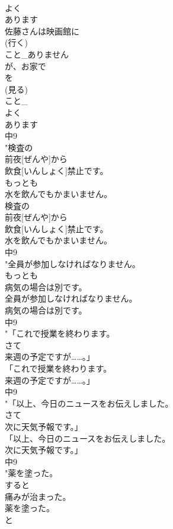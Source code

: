 \documentclass[8pt]{extreport}
\begin{document}
\begin{CJK}{UTF8}{min}
\\	よく
\\	あります
\\	佐藤さんは映画館に
\\	(行く)
\\	こと_ありません
\\	が、お家で
\\	を
\\	(見る)
\\	こと_
\\	よく
\\	あります
\\	中9
\\	"検査の
\\	前夜[ぜんや]から
\\	飲食[いんしょく]禁止です。
\\	もっとも
\\	水を飲んでもかまいません。
\\	検査の
\\	前夜[ぜんや]から
\\	飲食[いんしょく]禁止です。
\\	水を飲んでもかまいません。
\\	中9
\\	"全員が参加しなければなりません。
\\	もっとも
\\	病気の場合は別です。
\\	全員が参加しなければなりません。
\\	病気の場合は別です。
\\	中9
\\	"「これで授業を終わります。
\\	さて
\\	来週の予定ですが……。」
\\	「これで授業を終わります。
\\	来週の予定ですが……。」
\\	中9
\\	"「以上、今日のニュースをお伝えしました。
\\	さて
\\	次に天気予報です。」
\\	「以上、今日のニュースをお伝えしました。
\\	次に天気予報です。」
\\	中9
\\	"薬を塗った。
\\	すると
\\	痛みが治まった。
\\	薬を塗った。
\\	と

\end{CJK}
\end{document}
